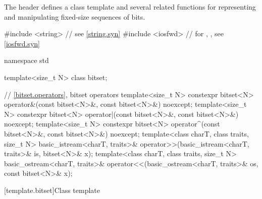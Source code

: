 \pnum
The header  defines a class template
and several related functions for representing
and manipulating fixed-size sequences of bits.

\begin{codeblock}
#include <string>   // see \ref{string.syn}
#include <iosfwd>   // for , , see \ref{iosfwd.syn}

namespace std {
  template<size_t N> class bitset;

  // \ref{bitset.operators}, bitset operators
  template<size_t N>
    constexpr bitset<N> operator&(const bitset<N>&, const bitset<N>&) noexcept;
  template<size_t N>
    constexpr bitset<N> operator|(const bitset<N>&, const bitset<N>&) noexcept;
  template<size_t N>
    constexpr bitset<N> operator^(const bitset<N>&, const bitset<N>&) noexcept;
  template<class charT, class traits, size_t N>
    basic_istream<charT, traits>&
      operator>>(basic_istream<charT, traits>& is, bitset<N>& x);
  template<class charT, class traits, size_t N>
    basic_ostream<charT, traits>&
      operator<<(basic_ostream<charT, traits>& os, const bitset<N>& x);
}
\end{codeblock}

[template.bitset]{Class template }%

